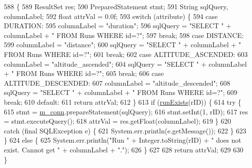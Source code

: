 \begin{DoxyCode}
588                                                                                    \{
589         ResultSet res;
590         PreparedStatement stmt;
591         String sqlQuery, columnLabel;
592         \textcolor{keywordtype}{float} attrVal = 0.0f;
593         \textcolor{keywordflow}{switch} (attribute) \{
594             \textcolor{keywordflow}{case} DURATION:
595                 columnLabel = \textcolor{stringliteral}{"duration"};
596                 sqlQuery = \textcolor{stringliteral}{"SELECT "} + columnLabel + \textcolor{stringliteral}{" FROM Runs WHERE id=?"};
597                 \textcolor{keywordflow}{break};
598             \textcolor{keywordflow}{case} DISTANCE:
599                 columnLabel = \textcolor{stringliteral}{"distance"};
600                 sqlQuery = \textcolor{stringliteral}{"SELECT "} + columnLabel + \textcolor{stringliteral}{" FROM Runs WHERE id=?"};
601                 \textcolor{keywordflow}{break};
602             \textcolor{keywordflow}{case} ALTITUDE\_ASCENDED:
603                 columnLabel = \textcolor{stringliteral}{"altitude\_ascended"};
604                 sqlQuery = \textcolor{stringliteral}{"SELECT "} + columnLabel + \textcolor{stringliteral}{" FROM Runs WHERE id=?"};
605                 \textcolor{keywordflow}{break};
606             \textcolor{keywordflow}{case} ALTITUDE\_DESCENDED:
607                 columnLabel = \textcolor{stringliteral}{"altitude\_descended"};
608                 sqlQuery = \textcolor{stringliteral}{"SELECT "} + columnLabel + \textcolor{stringliteral}{" FROM Runs WHERE id=?"};
609                 \textcolor{keywordflow}{break};
610             \textcolor{keywordflow}{default}:
611                 \textcolor{keywordflow}{return} attrVal;
612         \}
613         \textcolor{keywordflow}{if} (\mbox{\hyperlink{classcom_1_1activitytracker_1_1_d_b_manager_a723ac1c573bacdd0b62894357bd65a9b}{runExists}}(rID)) \{
614             \textcolor{keywordflow}{try} \{
615                 stmt = \mbox{\hyperlink{classcom_1_1activitytracker_1_1_d_b_manager_a064088d13ac09eb147fdc19268771521}{m\_conn}}.prepareStatement(sqlQuery);
616                 stmt.setInt(1, rID);
617                 res = stmt.executeQuery();
618                 attrVal = res.getFloat(columnLabel);
619             \}
620             \textcolor{keywordflow}{catch} (\textcolor{keyword}{final} SQLException e) \{
621                 System.err.println(e.getMessage());
622             \}
623         \}
624         \textcolor{keywordflow}{else} \{
625             System.err.println(\textcolor{stringliteral}{"Run "} + Integer.toString(rID) + \textcolor{stringliteral}{" does not exist. Cannot get "} + 
      columnLabel + \textcolor{stringliteral}{"."});
626         \}
627 
628         \textcolor{keywordflow}{return} attrVal;
629 
630     \}
\end{DoxyCode}
\mbox{\label{classcom_1_1activitytracker_1_1_d_b_manager_a48d9e51c1b73064b8f773cdde5113928}} 
